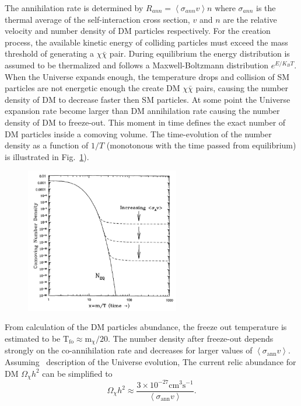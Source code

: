 The annihilation rate is determined by $R_{ann} = \left<\sigma_{ann}v \right>n$ where $\sigma_{ann}$ is the thermal average of the self-interaction cross section, $v$ and $n$ are the relative velocity and number density of DM particles respectively. For the creation process, the available kinetic energy of colliding particles must exceed the mass threshold of generating a $\chi\bar{\chi}$ pair. During equilibrium the energy distribution is assumed to be thermalized and follows a Maxwell-Boltzmann distribution $e^{E/K_BT}$. When the Universe expands enough, the temperature drops and collision of SM particles are not energetic enough the create DM $\chi\bar{\chi}$ pairs, causing the number density of DM to decrease faster then SM particles. At some point the Universe expansion rate become larger than DM annihilation rate causing the number density of DM to freeze-out. This moment in time defines the exact number of DM particles inside a comoving volume. The time-evolution of the number density as a function of $1/T$ (monotonous with the time passed from equilibrium) is illustrated in Fig.~\ref{fig:WIMP_Miracle}).

\begin{figure}[]
	\centering
	\includegraphics[width=0.6\textwidth]{figs/WIMP_Miracle.jpg}
	\label{fig:WIMP_Miracle}
\end{figure}  

From calculation of the DM particles abundance, the freeze out temperature is estimated to be $\mathrm{T_{fo}} \approx \mathrm{m}_{\chi} / 20$. The number density after freeze-out depends strongly on the co-annihilation rate and decreases for larger values of $\left<\sigma_{\mathrm{ann}}v\right>$. Assuming \cdm\ description of the Universe evolution, The current relic abundance for DM $\Omega_{\chi} h^2$ can be simplified to
\begin{equation}
\label{eq:wimp}
\Omega_\chi h^2 \approx \frac{3\times10^{-27}\mathrm{cm^3s^{-1}}}{\left<\sigma_{\mathrm{ann}}v\right>}.
\end{equation}   

